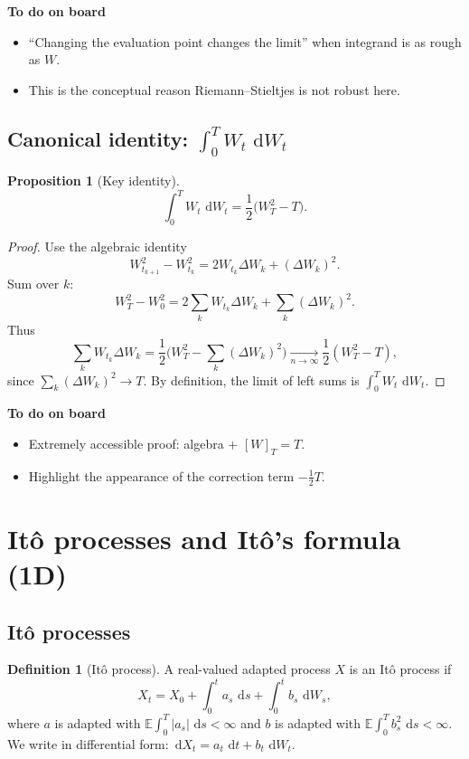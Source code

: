 \documentclass[11pt]{article}
\newcommand{\E}{\mathbb{E}}
\newcommand{\1}{\mathbf{1}}
\newcommand{\dd}{\,\mathrm{d}}
\numberwithin{equation}{section}
\theoremstyle{plain}
\newtheorem{proposition}[theorem]{Proposition}
\theoremstyle{definition}
\newtheorem{definition}[theorem]{Definition}
\theoremstyle{remark}
\begin{document}
\textbf{To do on board}
\begin{itemize}[leftmargin=2em]
  \item “Changing the evaluation point changes the limit” when integrand is as rough as $W$.
  \item This is the conceptual reason Riemann--Stieltjes is not robust here.
\end{itemize}


\subsection{Canonical identity: $\int_0^T W_t\,\dd W_t$}

\begin{proposition}[Key identity]
\[
\int_0^T W_t\,\dd W_t=\frac12\big(W_T^2-T\big).
\]
\end{proposition}

\begin{proof}
Use the algebraic identity
\[
W_{t_{k+1}}^2-W_{t_k}^2 = 2W_{t_k}\Delta W_k + (\Delta W_k)^2.
\]
Sum over $k$:
\[
W_T^2-W_0^2=2\sum_k W_{t_k}\Delta W_k + \sum_k(\Delta W_k)^2.
\]
Thus
\[
\sum_k W_{t_k}\Delta W_k
=\frac12\Big(W_T^2-\sum_k(\Delta W_k)^2\Big)\xrightarrow[n\to\infty]{}\frac12(W_T^2-T),
\]
since $\sum_k(\Delta W_k)^2\to T$.
By definition, the limit of left sums is $\int_0^T W_t\,\dd W_t$.
\end{proof}

\textbf{To do on board}
\begin{itemize}[leftmargin=2em]
  \item Extremely accessible proof: algebra + $[W]_T=T$.
  \item Highlight the appearance of the correction term $-\tfrac12T$.
\end{itemize}


\section{It\^o processes and It\^o's formula (1D)}

\subsection{It\^o processes}

\begin{definition}[It\^o process]
A real-valued adapted process $X$ is an It\^o process if
\[
X_t=X_0+\int_0^t a_s\,\dd s+\int_0^t b_s\,\dd W_s,
\]
where $a$ is adapted with $\E\int_0^T|a_s|\,\dd s<\infty$ and
$b$ is adapted with $\E\int_0^T b_s^2\,\dd s<\infty$.
We write in differential form: $\dd X_t=a_t\,\dd t+b_t\,\dd W_t$.
\end{definition}
\end{document}
